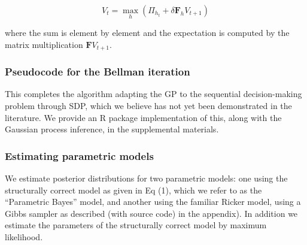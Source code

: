 \documentclass[author-year, review]{elsarticle} %
\newenvironment{Shaded}{}{}
\newcommand{\KeywordTok}[1]{\textcolor[rgb]{0.00,0.44,0.13}{\textbf{{#1}}}}
\newcommand{\DataTypeTok}[1]{\textcolor[rgb]{0.56,0.13,0.00}{{#1}}}
\newcommand{\DecValTok}[1]{\textcolor[rgb]{0.25,0.63,0.44}{{#1}}}
\newcommand{\CommentTok}[1]{\textcolor[rgb]{0.38,0.63,0.69}{\textit{{#1}}}}
\newcommand{\NormalTok}[1]{{#1}}
\begin{document}
\[V_{t} = \max_h \left( \Pi_{h_{t}} + \delta \mathbf{F}_h V_{t+1} \right)\]

where the sum is element by element and the expectation is computed by
the matrix multiplication $\mathbf{F} V_{t+1}$.

\subsubsection{Pseudocode for the Bellman iteration}

\begin{Shaded}
\end{Shaded}

This completes the algorithm adapting the GP to the sequential
decision-making problem through SDP, which we believe has not yet been
demonstrated in the literature. We provide an R package implementation
of this, along with the Gaussian process inference, in the supplemental
materials.

\subsubsection{Estimating parametric models}

We estimate posterior distributions for two parametric models: one using
the structurally correct model as given in Eq (1), which we refer to as
the ``Parametric Bayes'' model, and another using the familiar Ricker
model, using a Gibbs sampler as described (with source code) in the
appendix). In addition we estimate the parameters of the structurally
correct model by maximum likelihood.
\end{document}
